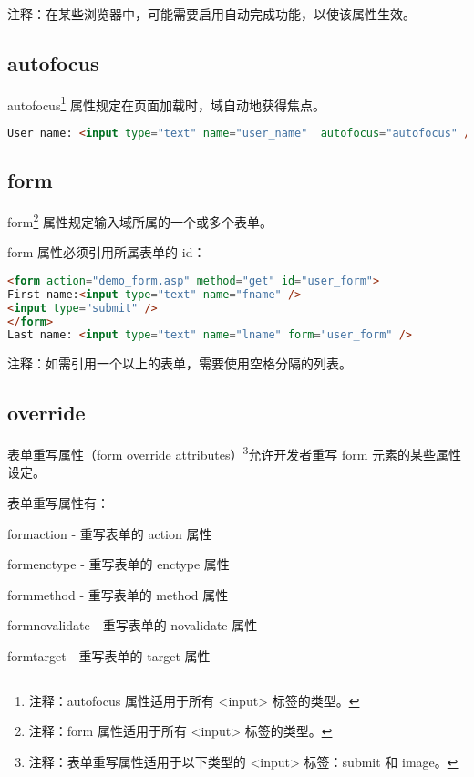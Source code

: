 注释：在某些浏览器中，可能需要启用自动完成功能，以使该属性生效。


\subsection{autofocus}


autofocus\footnote{注释：autofocus 属性适用于所有 <input> 标签的类型。} 属性规定在页面加载时，域自动地获得焦点。

\begin{lstlisting}[language=HTML]
User name: <input type="text" name="user_name"  autofocus="autofocus" />
\end{lstlisting}



\subsection{form}

form\footnote{注释：form 属性适用于所有 <input> 标签的类型。} 属性规定输入域所属的一个或多个表单。

form 属性必须引用所属表单的 id：


\begin{lstlisting}[language=HTML]
<form action="demo_form.asp" method="get" id="user_form">
First name:<input type="text" name="fname" />
<input type="submit" />
</form>
Last name: <input type="text" name="lname" form="user_form" />
\end{lstlisting}

注释：如需引用一个以上的表单，需要使用空格分隔的列表。

\subsection{override}

表单重写属性（form override attributes）\footnote{注释：表单重写属性适用于以下类型的 <input> 标签：submit 和 image。}允许开发者重写 form 元素的某些属性设定。


表单重写属性有：

\begin{compactitem}
\item formaction - 重写表单的 action 属性
\item formenctype - 重写表单的 enctype 属性
\item formmethod - 重写表单的 method 属性
\item formnovalidate - 重写表单的 novalidate 属性
\item formtarget - 重写表单的 target 属性
\end{compactitem}


